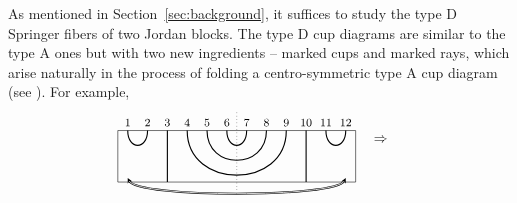 \documentclass[11pt,reqno]{amsart}
\numberwithin{equation}{section}
\theoremstyle{definition}
\newcommand{\cB}{\mathcal{B}}
\begin{document}
As mentioned in Section~\ref{sec:background}, it suffices to study the type D Springer fibers of two Jordan blocks.
The type D cup diagrams are similar to the type A ones but with two new ingredients -- marked cups and marked rays, which arise naturally in the process of folding a centro-symmetric type A cup diagram (see \cite{ES15, LS13}).
For example,
\[
\begin{tikzpicture}[baseline={(0,-.3)}]
\draw (-.25,0) -- (5.75,0) -- (5.75,-1.3) -- (-.25,-1.3) -- cycle;
\draw[dotted] (2.75,-1.5) -- (2.75,.5);
\draw[>=stealth, <->, double] (0,-1.2) .. controls +(.25,-.5) and +(-.25,-.5) .. (5.5,-1.2);
\begin{footnotesize}
\node at (0,.2) {$1$};
\node at (.5,.2) {$2$};
\node at (1,.2) {$3$};
\node at (1.5,.2) {$4$};
\node at (2,.2) {$5$};
\node at (2.5,.2) {$6$};
\node at (3,.2) {$7$};
\node at (3.5,.2) {$8$};
\node at (4,.2) {$9$};
\node at (4.5,.2) {$10$};
\node at (5,.2) {$11$};
\node at (5.5,.2) {$12$};
\end{footnotesize}
\draw[thick] (1,0) -- (1, -1.3);
\draw[thick] (4.5,0) -- (4.5, -1.3);
\draw[thick] (0,0) .. controls +(0,-.5) and +(0,-.5) .. +(.5,0);
\draw[thick] (1.5,0) .. controls +(0,-1.5) and +(0,-1.5) .. +(2.5,0);
\draw[thick] (2,0) .. controls +(0,-1) and +(0,-1) .. +(1.5,0);
\draw[thick] (2.5,0) .. controls +(0,-.5) and +(0,-.5) .. +(.5,0);
\draw[thick] (5,0) .. controls +(0,-.5) and +(0,-.5) .. +(.5,0);
\end{tikzpicture}
\quad
\Rightarrow
\quad
\]
\end{document}
